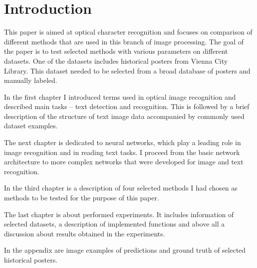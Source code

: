 \chapter*{Introduction}


This paper is aimed at optical character recognition and focuses on comparison of different methods that are used in this branch of image processing. The goal of the paper is to test selected methods with various parameters on different datasets. One of the datasets includes historical posters from Vienna City Library. This dataset needed to be selected from a broad database of posters and manually labeled.

In the first chapter I introduced terms used in optical image recognition and described main tasks -- text detection and recognition. This is followed by a brief description of the structure of text image data accompanied by commonly used dataset examples.

The next chapter is dedicated to neural networks, which play a leading role in image recognition and in reading text tasks. I proceed from the basic network architecture to more complex networks that were developed for image and text recognition.

In the third chapter is a description of four selected methods I had chosen as methods to be tested for the purpose of this paper.

The last chapter is about performed experiments. It includes information of selected datasets, a description of implemented functions and above all a discussion about results obtained in the experiments.

In the appendix are image examples of predictions and ground truth of selected historical posters.
